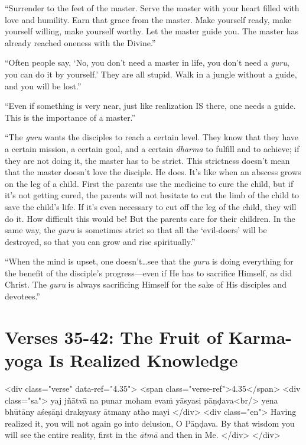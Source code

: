 \enquote{Surrender to the feet of the master. Serve the master with your heart filled with love and humility. Earn that grace from the master. Make yourself ready, make yourself willing, make yourself worthy. Let the master guide you. The master has already reached oneness with the Divine.}

\enquote{Often people say, \enquote{No, you don’t need a master in life, you don’t need a \textit{guru}, you can do it by yourself.} They are all stupid. Walk in a jungle without a guide, and you will be lost.}

\enquote{Even if something is very near, just like realization IS there, one needs a guide. This is the importance of a master.}

\enquote{The \textit{guru} wants the disciples to reach a certain level. They know that they have a certain mission, a certain goal, and a certain \textit{dharma} to fulfill and to achieve; if they are not doing it, the master has to be strict. This strictness doesn’t mean that the master doesn’t love the disciple. He does. It’s like when an abscess grows on the leg of a child. First the parents use the medicine to cure the child, but if it’s not getting cured, the parents will not hesitate to cut the limb of the child to save the child’s life. If it’s even necessary to cut off the leg of the child, they will do it. How difficult this would be! But the parents care for their children. In the same way, the \textit{guru} is sometimes strict so that all the \enquote{evil-doers} will be destroyed, so that you can grow and rise spiritually.}

\enquote{When the mind is upset, one doesn’t\ldots see that the \textit{guru} is doing everything for the benefit of the disciple’s progress---even if He has to sacrifice Himself, as did Christ. The \textit{guru} is always sacrificing Himself for the sake of His disciples and devotees.}

\section{Verses 35-42: The Fruit of Karma-yoga Is Realized Knowledge}\label{sec-verses-35-42-the-fruit-of-karma-yoga-is-realized-knowledge}

\begin{html}
<div class="verse" data-ref="4.35">
  <span class="verse-ref">4.35</span>
  <div class="sa">
    yaj jñātvā na punar moham evaṁ yāsyasi pāṇḍava<br/>
    yena bhūtāny aśeṣāṇi drakṣyasy ātmany atho mayi
  </div>
  <div class="en">
    Having realized it, you will not again go into delusion, O Pāṇḍava. By that wisdom you will see the entire reality, first in the \textit{ātmā} and then in Me.
  </div>
</div>
\end{html}



